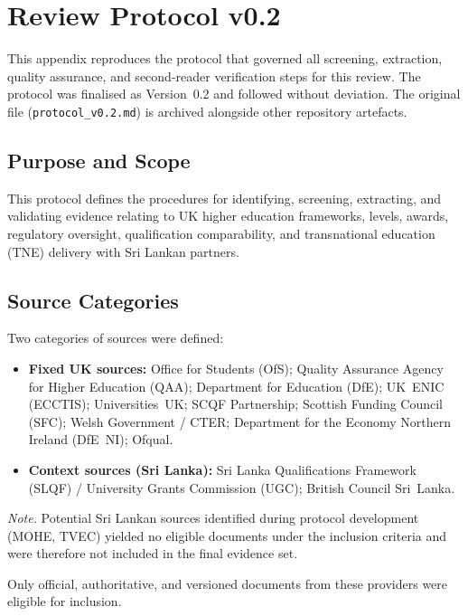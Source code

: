 \section{Review Protocol v0.2}

This appendix reproduces the protocol that governed all screening, extraction,
quality assurance, and second-reader verification steps for this review. The
protocol was finalised as Version~0.2 and followed without deviation. The
original file (\texttt{protocol\_v0.2.md}) is archived alongside other
repository artefacts.

\subsection{Purpose and Scope}

This protocol defines the procedures for identifying, screening, extracting,
and validating evidence relating to UK higher education frameworks, levels,
awards, regulatory oversight, qualification comparability, and transnational
education (TNE) delivery with Sri Lankan partners.

\subsection{Source Categories}

Two categories of sources were defined:

\begin{itemize}
    \item \textbf{Fixed UK sources:} Office for Students (OfS); Quality Assurance 
    Agency for Higher Education (QAA); Department for Education (DfE); UK~ENIC 
    (ECCTIS); Universities~UK; SCQF Partnership; Scottish Funding Council (SFC); 
    Welsh Government / CTER; Department for the Economy Northern Ireland (DfE~NI); 
    Ofqual.

    \item \textbf{Context sources (Sri Lanka):} Sri Lanka Qualifications Framework 
    (SLQF) / University Grants Commission (UGC); British Council Sri~Lanka.
\end{itemize}

\noindent\textit{Note.} Potential Sri Lankan sources identified during protocol development 
(MOHE, TVEC) yielded no eligible documents under the inclusion criteria and were 
therefore not included in the final evidence set.



Only official, authoritative, and versioned documents from these providers were
eligible for inclusion.

